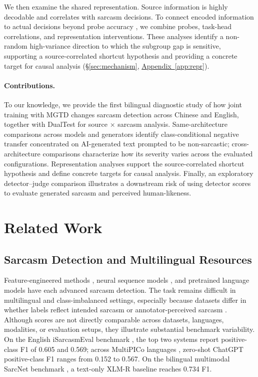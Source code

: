 \documentclass[11pt]{article}
\newcommand{\Sref}[1]{\hyperref[#1]{\S\ref*{#1}}}
\newcommand{\Appref}[1]{\hyperref[#1]{Appendix~\ref*{#1}}}
\begin{document}
We then examine the shared representation. Source information is highly decodable and correlates with sarcasm decisions. To connect encoded information to actual decisions beyond probe accuracy \citep{hewitt2019probes,elazar2021amnesic}, we combine probes, task-head correlations, and representation interventions. These analyses identify a non-random high-variance direction to which the subgroup gap is sensitive, supporting a source-correlated shortcut hypothesis and providing a concrete target for causal analysis (\Sref{sec:mechanism}, \Appref{app:repr}).

\paragraph{Contributions.} To our knowledge, we provide the first bilingual diagnostic study of how joint training with MGTD changes sarcasm detection across Chinese and English, together with DualTest for source $\times$ sarcasm analysis. Same-architecture comparisons across models and generators identify class-conditional negative transfer concentrated on AI-generated text prompted to be non-sarcastic; cross-architecture comparisons characterize how its severity varies across the evaluated configurations. Representation analyses support the source-correlated shortcut hypothesis and define concrete targets for causal analysis. Finally, an exploratory detector--judge comparison illustrates a downstream risk of using detector scores to evaluate generated sarcasm and perceived human-likeness.

\section{Related Work}
\label{sec:related}

\subsection{Sarcasm Detection and Multilingual Resources}
\label{sec:related-sarcasm}

Feature-engineered methods \citep{riloff2013sarcasm}, neural sequence models \citep{ghosh2016fracking,tay2018reasoning}, and pretrained language models \citep{khatri2020,du2022pali} have each advanced sarcasm detection. The task remains difficult in multilingual and class-imbalanced settings, especially because datasets differ in whether labels reflect intended sarcasm or annotator-perceived sarcasm \citep{oprea2020isarcasm,abufarha2022isarcasmeval,casola2024multipico}. Although scores are not directly comparable across datasets, languages, modalities, or evaluation setups, they illustrate substantial benchmark variability. On the English iSarcasmEval benchmark \citep{abufarha2022isarcasmeval}, the top two systems report positive-class F1 of 0.605 and 0.569; across MultiPICo languages \citep{casola2024multipico}, zero-shot ChatGPT positive-class F1 ranges from 0.152 to 0.567. On the bilingual multimodal SarcNet benchmark \citep{yue2024sarcnet}, a text-only XLM-R baseline reaches 0.734 F1.
\end{document}
